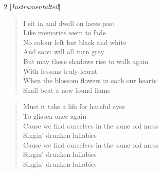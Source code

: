 \documentclass[9pt,a4paper,oneside, onecolumn]{article}
\begin{document}
\begin{multicols}{2}
[\textit{Instrumentalteil}]

\begin{verse}
I sit in and dwell on faces past\\
Like memories seem to fade\\
No colour left but black and white\\
And soon will all turn grey\\
But may these shadows rise to walk again\\
With lessons truly learnt\\
When the blossom flowers in each our hearts\\
Shall beat a new found flame\\
\end{verse}
\begin{verse}
Must it take a life for hateful eyes\\
To glisten once again\\
Cause we find ourselves in the same old mess\\
Singin' drunken lullabies\\
Cause we find ourselves in the same old mess\\
Singin' drunken lullabies\\
Singin' drunken lullabies\\
\end{verse}

\end{multicols}
\end{document}
